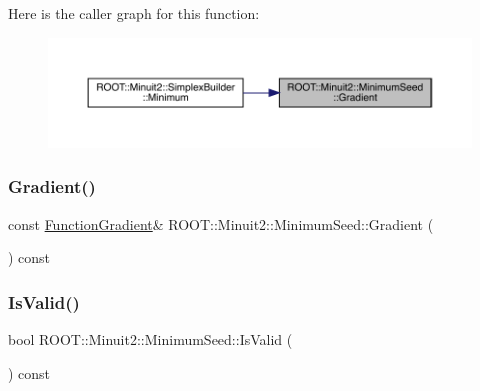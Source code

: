 Here is the caller graph for this function\+:
\nopagebreak
\begin{figure}[H]
\begin{center}
\leavevmode
\includegraphics[width=350pt]{d1/d50/classROOT_1_1Minuit2_1_1MinimumSeed_acde7a067ded2fb87a3dba51ba82a1afd_icgraph}
\end{center}
\end{figure}
\mbox{\label{classROOT_1_1Minuit2_1_1MinimumSeed_acde7a067ded2fb87a3dba51ba82a1afd}} 
\subsubsection{\texorpdfstring{Gradient()}{Gradient()}\hspace{0.1cm}{\footnotesize\ttfamily [3/3]}}
{\footnotesize\ttfamily const \mbox{\hyperlink{classROOT_1_1Minuit2_1_1FunctionGradient}{Function\+Gradient}}\& R\+O\+O\+T\+::\+Minuit2\+::\+Minimum\+Seed\+::\+Gradient (\begin{DoxyParamCaption}{ }\end{DoxyParamCaption}) const\hspace{0.3cm}{\ttfamily [inline]}}

\mbox{\label{classROOT_1_1Minuit2_1_1MinimumSeed_a5d9ffd4dbd68f6cfcfef821844e70158}} 
\subsubsection{\texorpdfstring{IsValid()}{IsValid()}\hspace{0.1cm}{\footnotesize\ttfamily [1/3]}}
{\footnotesize\ttfamily bool R\+O\+O\+T\+::\+Minuit2\+::\+Minimum\+Seed\+::\+Is\+Valid (\begin{DoxyParamCaption}{ }\end{DoxyParamCaption}) const\hspace{0.3cm}{\ttfamily [inline]}}


